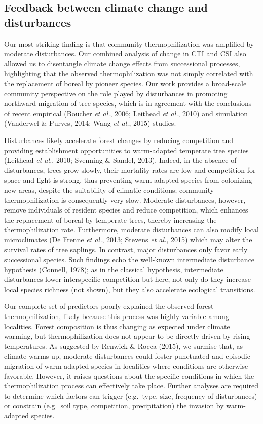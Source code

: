 \documentclass[a4paperpaper,]{article}
\begin{document}
\hypertarget{feedback-between-climate-change-and-disturbances}{%
\subsection{Feedback between climate change and
disturbances}\label{feedback-between-climate-change-and-disturbances}}

Our most striking finding is that community thermophilization was
amplified by moderate disturbances. Our combined analysis of change in
CTI and CSI also allowed us to disentangle climate change effects from
successional processes, highlighting that the observed thermophilization
was not simply correlated with the replacement of boreal by pioneer
species. Our work provides a broad-scale community perspective on the
role played by disturbances in promoting northward migration of tree
species, which is in agreement with the conclusions of recent empirical
(Boucher \emph{et al.}, 2006; Leithead \emph{et al.}, 2010) and
simulation (Vanderwel \& Purves, 2014; Wang \emph{et al.}, 2015)
studies.

Disturbances likely accelerate forest changes by reducing competition
and providing establishment opportunities to warm-adapted temperate tree
species (Leithead \emph{et al.}, 2010; Svenning \& Sandel, 2013).
Indeed, in the absence of disturbances, trees grow slowly, their
mortality rates are low and competition for space and light is strong,
thus preventing warm-adapted species from colonizing new areas, despite
the suitability of climatic conditions; community thermophilization is
consequently very slow. Moderate disturbances, however, remove
individuals of resident species and reduce competition, which enhances
the replacement of boreal by temperate trees, thereby increasing the
thermophilization rate. Furthermore, moderate disturbances can also
modify local microclimates (De Frenne \emph{et al.}, 2013; Stevens
\emph{et al.}, 2015) which may alter the survival rates of tree
saplings. In contrast, major disturbances only favor early successional
species. Such findings echo the well-known intermediate disturbance
hypothesis (Connell, 1978); as in the classical hypothesis, intermediate
disturbances lower interspecific competition but here, not only do they
increase local species richness (not shown), but they also accelerate
ecological transitions.

Our complete set of predictors poorly explained the observed forest
thermophilization, likely because this process was highly variable among
localities. Forest composition is thus changing as expected under
climate warming, but thermophilization does not appear to be directly
driven by rising temperatures. As suggested by Renwick \& Rocca (2015),
we surmise that, as climate warms up, moderate disturbances could foster
punctuated and episodic migration of warm-adapted species in localities
where conditions are otherwise favorable. However, it raises questions
about the specific conditions in which the thermophilization process can
effectively take place. Further analyses are required to determine which
factors can trigger (e.g.~type, size, frequency of disturbances) or
constrain (e.g.~soil type, competition, precipitation) the invasion by
warm-adapted species.
\end{document}
